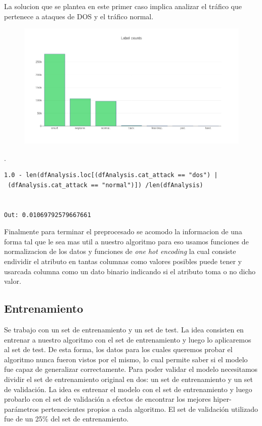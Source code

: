 \documentclass[a4paper,10pt]{article}
\begin{document}
La solucion que se plantea en este primer caso implica analizar  el tráfico que pertenece a ataques de DOS y el tráfico normal. 
\medskip
\begin{figure}[!htp]
\centering
\includegraphics[scale=0.5]{Wireshark/newplot(2).png} 
\caption{}
\end{figure}

.
\newpage
\lstset{language=Python}
\lstset{frame=lines}
\lstset{basicstyle=\footnotesize}
\begin{lstlisting}
1.0 - len(dfAnalysis.loc[(dfAnalysis.cat_attack == "dos") | 
 (dfAnalysis.cat_attack == "normal")]) /len(dfAnalysis)


Out: 0.01069792579667661
\end{lstlisting}

Finalmente para terminar el preprocesado se acomodo la informacion de una forma tal que le sea mas util a nuestro algoritmo para eso usamos funciones de normalizacion de los datos y funciones de \textit{one hot encoding} la cual consiste endividir el atributo en tantas columnas como valores posibles puede tener y usarcada columna como un dato binario indicando si el atributo toma o no dicho valor.

\subsection{Entrenamiento}
Se trabajo con un set de entrenamiento y un set de test. La
idea consisten en entrenar a nuestro algoritmo con el set de entrenamiento y
luego lo aplicaremos al set de test. De esta forma, los datos para los cuales
queremos probar el algoritmo nunca fueron vistos por el mismo, lo cual permite
saber si el modelo fue capaz de generalizar correctamente. Para poder validar
el modelo necesitamos dividir el set de entrenamiento original en dos: un set de
entrenamiento y un set de validación. La idea es entrenar el modelo con el set
de entrenamiento y luego probarlo con el set de validación a efectos de encontrar
los mejores hiper-parámetros pertenecientes propios a cada algoritmo. El set de validación utilizado fue de un 25\% del set de entrenamiento.
\end{document}
